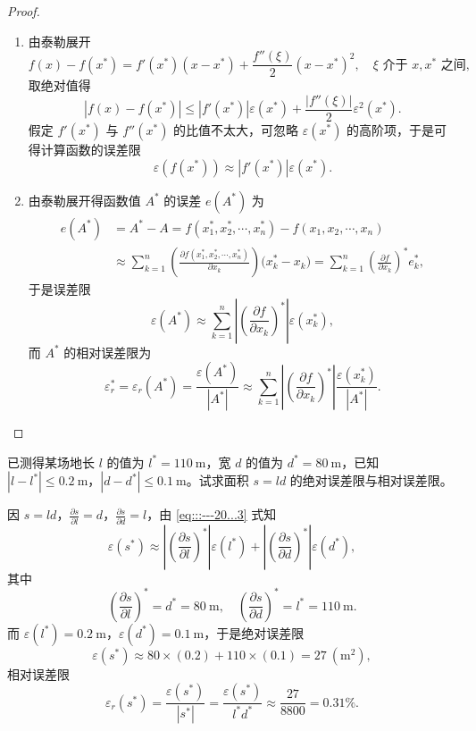\documentclass[../../main.tex]{subfiles}
\begin{document}
\begin{proof}
\begin{enumerate}
\item 由泰勒展开 
\[
f(x) - f(x^*) = f'(x^*)(x - x^*) + \frac{f''(\xi)}{2}(x - x^*)^2, \quad \xi \text{ 介于 } x, x^* \text{ 之间},
\]
取绝对值得 
\[
| f(x) - f(x^*) | \leqslant | f'(x^*) | \varepsilon(x^*) + \frac{| f''(\xi) |}{2} \varepsilon^2(x^*).
\]
假定 $f'(x^*)$ 与 $f''(x^*)$ 的比值不太大，可忽略 $\varepsilon(x^*)$ 的高阶项，于是可得计算函数的误差限 
\[
\varepsilon(f(x^*)) \approx | f'(x^*) | \varepsilon(x^*).
\]

\item 由泰勒展开得函数值 $A^*$ 的误差 $e(A^*)$ 为 
\begin{align*}
e(A^*)&=A^*-A=f(x_{1}^{*},x_{2}^{*},\cdots ,x_{n}^{*})-f(x_1,x_2,\cdots ,x_n)
\\
&\approx \sum_{k=1}^n{\left( \frac{\partial f(x_{1}^{*},x_{2}^{*},\cdots ,x_{n}^{*})}{\partial x_k} \right) (x_{k}^{*}}-x_k)=\sum_{k=1}^n{\left( \frac{\partial f}{\partial x_k} \right) ^*e_{k}^{*}},
\end{align*}
于是误差限 
\[
\varepsilon(A^*) \approx \sum_{k=1}^n \left| \left( \frac{\partial f}{\partial x_k} \right)^* \right| \varepsilon(x_k^*) ,
\]
而 $A^*$ 的相对误差限为 
\[
\varepsilon_r^* = \varepsilon_r(A^*) = \frac{\varepsilon(A^*)}{| A^* |} \approx \sum_{k=1}^n \left| \left( \frac{\partial f}{\partial x_k} \right)^* \right| \frac{\varepsilon(x_k^*)}{| A^* |} .
\]
\end{enumerate}
\end{proof}

\begin{example}
已测得某场地长 $l$ 的值为 $l^* = 110\ \mathrm{m}$，宽 $d$ 的值为 $d^* = 80\ \mathrm{m}$，已知 $| l - l^* | \leqslant 0.2\ \mathrm{m}$，$| d - d^* | \leqslant 0.1\ \mathrm{m}$。试求面积 $s = ld$ 的绝对误差限与相对误差限。
\end{example}
\begin{solution}
因 $s = ld$，$\frac{\partial s}{\partial l} = d$，$\frac{\partial s}{\partial d} = l$，由 \eqref{eq:::---20...3} 式知 
\[
\varepsilon(s^*) \approx \left| \left( \frac{\partial s}{\partial l} \right)^* \right| \varepsilon(l^*) + \left| \left( \frac{\partial s}{\partial d} \right)^* \right| \varepsilon(d^*),
\]
其中 
\[
\left( \frac{\partial s}{\partial l} \right)^* = d^* = 80\ \mathrm{m}, \quad \left( \frac{\partial s}{\partial d} \right)^* = l^* = 110\ \mathrm{m}.
\]
而 $\varepsilon(l^*) = 0.2\ \mathrm{m}$，$\varepsilon(d^*) = 0.1\ \mathrm{m}$，于是绝对误差限 
\[
\varepsilon(s^*) \approx 80 \times (0.2) + 110 \times (0.1) = 27\ (\mathrm{m^2}),
\]
相对误差限 
\[
\varepsilon_r(s^*) = \frac{\varepsilon(s^*)}{| s^* |} = \frac{\varepsilon(s^*)}{l^* d^*} \approx \frac{27}{8800} = 0.31\%.
\]
\end{solution}
\end{document}
